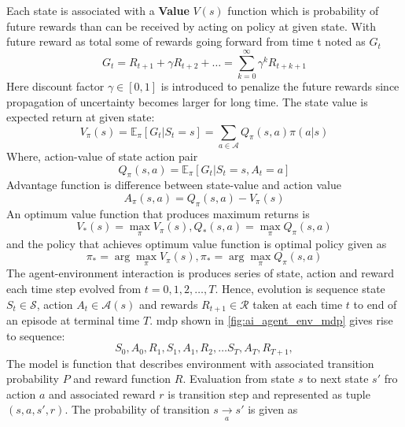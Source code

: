 Each state is associated with a \textbf{Value} $V(s)$ function which is probability of future rewards than can be received by acting on policy at given state. With future reward as total some of rewards going forward from time t noted as $G_t$
\begin{equation}
    G_t = R_{t+1} + \gamma R_{t+2} + \dots = \sum_{k=0}^{\infty} \gamma^k R_{t+k+1}
\end{equation}
Here discount factor $\gamma \in [0,1]$ is introduced to  penalize the future rewards since propagation of uncertainty becomes larger for long time. The state value is expected return at given state:
\begin{equation}
    V_{\pi}(s) = \mathbb{E}_{\pi}[G_t \vert S_t = s] = \sum_{a \in \mathcal{A}} Q_{\pi}(s, a) \pi(a \vert s)
\end{equation}
Where, action-value of state action pair
\begin{equation}
Q_{\pi}(s, a) = \mathbb{E}_{\pi}[G_t \vert S_t = s, A_t = a]    
\end{equation}
Advantage function is difference between state-value and action value
\begin{equation}
    A_{\pi}(s, a) = Q_{\pi}(s, a) - V_{\pi}(s)
\end{equation}
An optimum value function that produces maximum returns is
\begin{equation}
    V_{*}(s) = \max_{\pi} V_{\pi}(s),
Q_{*}(s, a) = \max_{\pi} Q_{\pi}(s, a)
\end{equation}
and the policy that achieves optimum value function is optimal policy given as
\begin{equation}
    \pi_{*} = \arg\max_{\pi} V_{\pi}(s),
\pi_{*} = \arg\max_{\pi} Q_{\pi}(s, a)
\end{equation}
The agent-environment interaction is produces series of state, action and reward each time step evolved from $t=0,1,2,\dots,T$. Hence, evolution is sequence state $S_t \in \mathcal{S}$, action $A_t \in \mathcal{A}(s)$ and rewards $R_{t+1} \in \mathcal{R}$ taken at each time $t$ to end of an episode at terminal time $T$.
\acrlong{mdp} shown in \autoref{fig:ai_agent_env_mdp} gives rise to sequence:
\begin{equation*}
    S_0, A_0, R_1,S_1, A_1, R_2, \dots S_{T}, A_{T}, R_{T+1},
\end{equation*}
The model is function that describes environment with associated transition probability $P$ and reward function $R$. Evaluation from state $s$ to next state $s'$ fro action $a$ and associated reward $r$ is transition step and represented as tuple $(s,a,s',r)$. The probability of transition ${\displaystyle s\xrightarrow[a]{} s'}$ is given as
